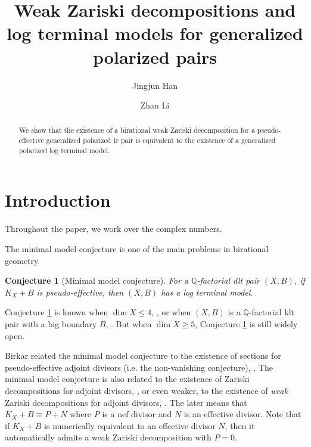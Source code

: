 \documentclass[11pt]{amsart}
\newcommand{\Qq}{\mathbb{Q}}
\newtheorem{conjecture}[theorem]{Conjecture}
\begin{document}
\title[Weak Zariski decompositions and log terminal models]{Weak Zariski decompositions and log terminal models for generalized polarized pairs}

\begin{abstract}
We show that the existence of a birational weak Zariski decomposition for a pseudo-effective generalized polarized lc pair is equivalent to the existence of a generalized polarized log terminal model.
\end{abstract}

\author{Jingjun Han}
\address{Beijing International Center for Mathematical Research, Peking University,
Beijing 100871, China}
\address{Department of Mathematics, Johns Hopkins University, Baltimore, MD 21218, USA}


\author{Zhan Li}
\address{Department of Mathematics, Southern University of Science and Technology, 1088 Xueyuan Rd, Shenzhen 518055, China} 


\maketitle

\tableofcontents



\section{Introduction}\label{sec: introduction}
Throughout the paper, we work over the complex numbers.

The minimal model conjecture is one of the main problems in birational geometry.	

\begin{conjecture}[Minimal model conjecture]\label{conj:logmmp} For a $\Qq$-factorial dlt pair $(X,B)$, if $K_X+B$ is pseudo-effective, then $(X,B)$ has a log terminal model.
\end{conjecture}

Conjecture \ref{conj:logmmp} is known when $\dim X\le 4$, \cite{Sho09, Birkar10}, or when $(X,B)$ is a $\Qq$-factorial klt pair with a big boundary $B$, \cite{BCHM10}. But when $\dim X\ge 5$, Conjecture \ref{conj:logmmp} is still widely open.

Birkar related the minimal model conjecture to the existence of sections for pseudo-effective adjoint divisors (i.e. the non-vanishing conjecture), \cite{Bir07, Birkar10, Birkar11}. The minimal model conjecture is also related to the existence of Zariski decompositions for adjoint divisors, \cite{Birkarhuweak14}, or even weaker, to the existence of \emph{weak} Zariski decompositions for adjoint divisors, \cite{Birkarweak12}. The later means that $K_X+B\equiv P+N$ where $P$ is a nef divisor and $N$ is an effective divisor. Note that if $K_X+B$ is numerically equivalent to an effective divisor $N$, then it automatically admits a weak Zariski decomposition with $P=0$.
\end{document}
